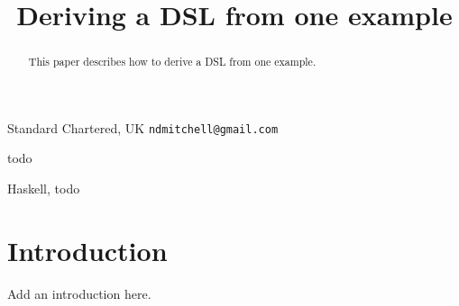 \documentclass[preprint]{sigplanconf}
\begin{document}
\copyrightdata{[to be supplied]}

\titlebanner{\today{} - \currenttime{}}        %
\preprintfooter{}   %

\title{Deriving a DSL from one example}

           {Standard Chartered, UK}
           {\verb"ndmitchell@gmail.com"}

\maketitle

\begin{abstract}
This paper describes how to derive a DSL from one example.
\end{abstract}


\terms
todo

\keywords
Haskell, todo

\section{Introduction}

Add an introduction here.

\balance



\end{document}

